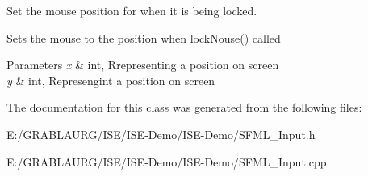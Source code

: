 Set the mouse position for when it is being locked. 

Sets the mouse to the position when lock\-Nouse() called


\begin{DoxyParams}{Parameters}
{\em x} & int, Rrepresenting a position on screen \\
\hline
{\em y} & int, Represengint a position on screen \\
\hline
\end{DoxyParams}


The documentation for this class was generated from the following files\-:\begin{DoxyCompactItemize}
\item 
E\-:/\-G\-R\-A\-B\-L\-A\-U\-R\-G/\-I\-S\-E/\-I\-S\-E-\/\-Demo/\-I\-S\-E-\/\-Demo/S\-F\-M\-L\-\_\-\-Input.\-h\item 
E\-:/\-G\-R\-A\-B\-L\-A\-U\-R\-G/\-I\-S\-E/\-I\-S\-E-\/\-Demo/\-I\-S\-E-\/\-Demo/S\-F\-M\-L\-\_\-\-Input.\-cpp\end{DoxyCompactItemize}
